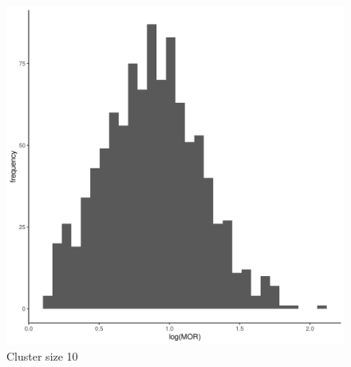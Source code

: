 \documentclass[
  letterpaper,
  DIV=11,
  numbers=noendperiod,
  titlepage]{scrartcl}
\begin{document}
\begin{figure}
\begin{minipage}[t]{0.24\linewidth}
{{\includegraphics{../../plots/two-lvl-ran-slope/low-prev/hist_100_10_two_lvl_slp_low_prev_q2.png}

}

\caption{Cluster size 10}

}

\end{minipage}%
%
\begin{minipage}[t]{0.24\linewidth}

{\centering 

}
\end{minipage}
\end{figure}
\end{document}
